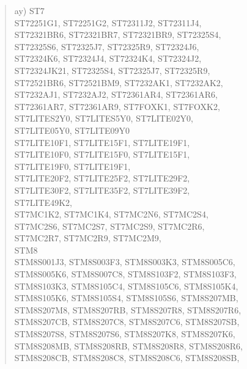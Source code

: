\documentclass[12pt,twoside]{report}
\begin{document}
\begin{quote}
ay) ST7 \\
    ST72251G1, ST72251G2, ST72311J2, ST72311J4, \\
    ST72321BR6, ST72321BR7, ST72321BR9, ST72325S4, \\
    ST72325S6, ST72325J7, ST72325R9, ST72324J6, \\
    ST72324K6, ST72324J4, ST72324K4, ST72324J2, \\
    ST72324JK21, ST72325S4, ST72325J7, ST72325R9, \\
    ST72521BR6, ST72521BM9, ST7232AK1, ST7232AK2, \\
    ST7232AJ1, ST7232AJ2, ST72361AR4, ST72361AR6, \\
    ST72361AR7, ST72361AR9, ST7FOXK1, ST7FOXK2, \\
    ST7LITES2Y0, ST7LITES5Y0, ST7LITE02Y0, \\
    ST7LITE05Y0, ST7LITE09Y0 \\
    ST7LITE10F1, ST7LITE15F1, ST7LITE19F1, \\
    ST7LITE10F0, ST7LITE15F0, ST7LITE15F1, \\
    ST7LITE19F0, ST7LITE19F1, \\
    ST7LITE20F2, ST7LITE25F2, ST7LITE29F2, \\
    ST7LITE30F2, ST7LITE35F2, ST7LITE39F2, \\
    ST7LITE49K2, \\
    ST7MC1K2, ST7MC1K4, ST7MC2N6, ST7MC2S4, \\
    ST7MC2S6, ST7MC2S7, ST7MC2S9, ST7MC2R6, \\
    ST7MC2R7, ST7MC2R9, ST7MC2M9, \\
    STM8 \\
    STM8S001J3, STM8S003F3, STM8S003K3, STM8S005C6,\\
    STM8S005K6, STM8S007C8, STM8S103F2, STM8S103F3,\\
    STM8S103K3, STM8S105C4, STM8S105C6, STM8S105K4,\\
    STM8S105K6, STM8S105S4, STM8S105S6, STM8S207MB,\\
    STM8S207M8, STM8S207RB, STM8S207R8, STM8S207R6,\\
    STM8S207CB, STM8S207C8, STM8S207C6, STM8S207SB,\\
    STM8S207S8, STM8S207S6, STM8S207K8, STM8S207K6,\\
    STM8S208MB, STM8S208RB, STM8S208R8, STM8S208R6,\\
    STM8S208CB, STM8S208C8, STM8S208C6, STM8S208SB,\\

\end{quote}
\end{document}
